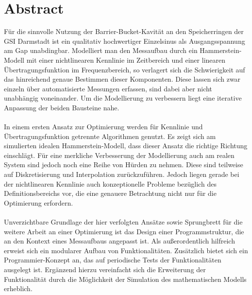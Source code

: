 \documentclass[../Report.tex]{subfiles}
\begin{document}
\chapter{Abstract}
\label{chap:abstract}

Für die sinnvolle Nutzung der Barrier-Bucket-Kavität an den Speicherringen der GSI Darmstadt ist ein qualitativ hochwertiger Einzelsinus als Ausgangsspannung am Gap unabdingbar. 
Modelliert man den Messaufbau durch ein Hammerstein-Modell mit einer nichtlinearen Kennlinie im Zeitbereich und einer linearen Übertragungsfunktion im Frequenzbereich, so verlagert sich die Schwierigkeit auf das hinreichend genaue Bestimmen dieser Komponenten.
Diese lassen sich zwar einzeln über automatisierte Messungen erfassen, sind dabei aber nicht unabhängig voneinander. Um die Modellierung zu verbessern liegt eine iterative Anpassung der beiden Bausteine nahe.
\\
\\
In einem ersten Ansatz zur Optimierung werden für Kennlinie und Übertragungsfunktion getrennte Algorithmen genutzt. Es zeigt sich am simulierten idealen Hammerstein-Modell, dass dieser Ansatz die richtige Richtung einschlägt.
Für eine merkliche Verbesserung der Modellierung auch am realen System sind jedoch noch eine Reihe von Hürden zu nehmen. Diese sind teilweise auf Diskretisierung und Interpolation zurückzuführen. Jedoch liegen gerade bei der nichtlinearen Kennlinie auch konzeptionelle Probleme bezüglich des Definitionsbereichs vor, die eine genauere Betrachtung nicht nur für die Optimierung erfordern.
\\
\\
Unverzichtbare Grundlage der hier verfolgten Ansätze sowie Sprungbrett für die weitere Arbeit an einer Optimierung ist das Design einer Programmstruktur, die an den Kontext eines Messaufbaus angepasst ist. Als außerordentlich hilfreich erweist sich ein modularer Aufbau von Funktionalitäten. Zusätzlich bietet sich ein Programmier-Konzept an, das auf periodische Tests der Funktionalitäten ausgelegt ist. Ergänzend hierzu vereinfacht sich die Erweiterung der Funktionalität durch die Möglichkeit der Simulation des mathematischen Modells erheblich.
\end{document}
